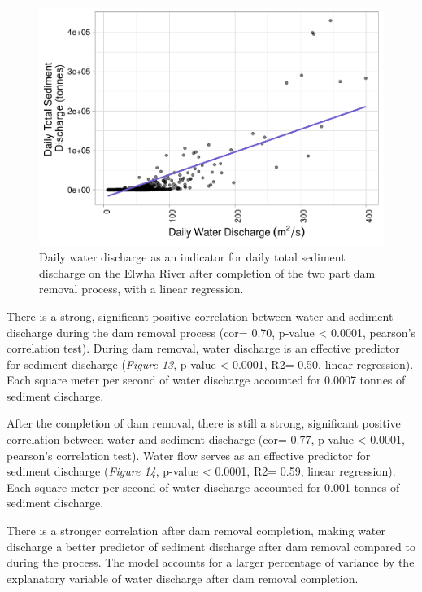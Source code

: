 \documentclass[12pt,]{article}
\begin{document}
\begin{figure}
\centering
\includegraphics{Mason_ENV872_ProjectFinal_files/figure-latex/Linear After (Figure 14)-1.pdf}
\caption{Daily water discharge as an indicator for daily total sediment
discharge on the Elwha River after completion of the two part dam
removal process, with a linear regression.}
\end{figure}

There is a strong, significant positive correlation between water and
sediment discharge during the dam removal process (cor= 0.70, p-value
\textless{} 0.0001, pearson's correlation test). During dam removal,
water discharge is an effective predictor for sediment discharge
(\emph{Figure 13}, p-value \textless{} 0.0001, R2= 0.50, linear
regression). Each square meter per second of water discharge accounted
for 0.0007 tonnes of sediment discharge.

After the completion of dam removal, there is still a strong,
significant positive correlation between water and sediment discharge
(cor= 0.77, p-value \textless{} 0.0001, pearson's correlation test).
Water flow serves as an effective predictor for sediment discharge
(\emph{Figure 14}, p-value \textless{} 0.0001, R2= 0.59, linear
regression). Each square meter per second of water discharge accounted
for 0.001 tonnes of sediment discharge.

There is a stronger correlation after dam removal completion, making
water discharge a better predictor of sediment discharge after dam
removal compared to during the process. The model accounts for a larger
percentage of variance by the explanatory variable of water discharge
after dam removal completion.
\end{document}
